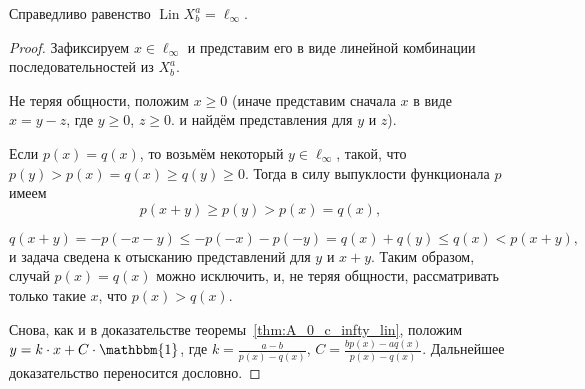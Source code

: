 \begin{theorem}
	\label{thm:Lin_ell_infty}
	Справедливо равенство $\operatorname{Lin} X^a_b = \ell_\infty$.
\end{theorem}

\begin{proof}
	Зафиксируем $x \in \ell_\infty$ и представим его в виде линейной комбинации последовательностей из $X^a_b$.

	Не теряя общности, положим $x\geq 0$
	(иначе представим сначала $x$ в виде $x = y - z$, где $y \geq 0$, $z \geq 0$.
	и найдём представления для $y$ и $z$).

	Если $p(x) = q(x)$, то возьмём некоторый $y\in\ell_\infty$,
	такой, что $p(y) > p(x) = q(x)  \geq q(y) \geq 0$.
	Тогда в силу выпуклости функционала $p$ имеем
	\begin{equation}
		p(x+y) \geq p(y) > p(x) = q(x)
		,
	\end{equation}


	\begin{equation}
		q(x+y) = -p(-x-y) \leq -p(-x) -p(-y) = q(x) + q(y) \leq q(x) < p(x+y)
		,
	\end{equation}
	и задача сведена к отысканию представлений для $y$ и $x+y$.
	Таким образом, случай $p(x) = q(x)$ можно исключить,
	и, не теряя общности, рассматривать только такие $x$, что $p(x) > q(x)$.

	Снова, как и в доказательстве теоремы~\ref{thm:A_0_c_infty_lin},
	положим $y=k\cdot x + C\cdot\mathbbm{1}$,
	где $k=\frac{a-b}{p(x)-q(x)}$, $C=\frac{bp(x)-aq(x)}{p(x)-q(x)}$.
	Дальнейшее доказательство переносится дословно.
\end{proof}

